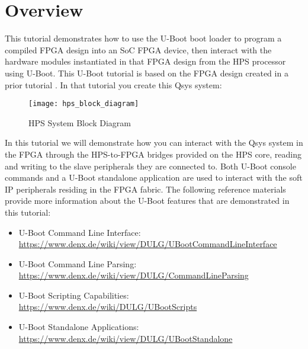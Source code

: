 \tableofcontents

\section*{Overview}

\begin{flushleft}
\noindent
This tutorial demonstrates how to use the U-Boot boot loader to program a compiled FPGA design into an SoC FPGA device, then interact with the hardware modules instantiated in that FPGA design from the HPS processor using U-Boot.  This U-Boot tutorial is based on the FPGA design created in a prior tutorial .  In that tutorial you create this Qsys system:

\begin{figure}[H]
\centering
\texttt{[image: hps\_block\_diagram]}
\caption{HPS System Block Diagram}
\label{fig:hps_block_diagram}
\end{figure}

In this tutorial we will demonstrate how you can interact with the Qsys system in the FPGA through the HPS-to-FPGA bridges provided on the HPS core, reading and writing to the slave peripherals they are connected to.  Both U-Boot console commands and a U-Boot standalone application are used to interact with the soft IP peripherals residing in the FPGA fabric.
\newline
\newline
The following reference materials provide more information about the U-Boot features that are demonstrated in this tutorial:

\begin{itemize}
\item U-Boot Command Line Interface: \href{https://www.denx.de/wiki/view/DULG/UBootCommandLineInterface}{https://www.denx.de/wiki/view/DULG/UBootCommandLineInterface}
\item U-Boot Command Line Parsing: \href{https://www.denx.de/wiki/view/DULG/CommandLineParsing}{https://www.denx.de/wiki/view/DULG/CommandLineParsing}
\item U-Boot Scripting Capabilities: \href{https://www.denx.de/wiki/DULG/UBootScripts}{https://www.denx.de/wiki/DULG/UBootScripts}
\item U-Boot Standalone Applications: \href{https://www.denx.de/wiki/view/DULG/UBootStandalone}{https://www.denx.de/wiki/view/DULG/UBootStandalone}
\end{itemize}

\end{flushleft}

